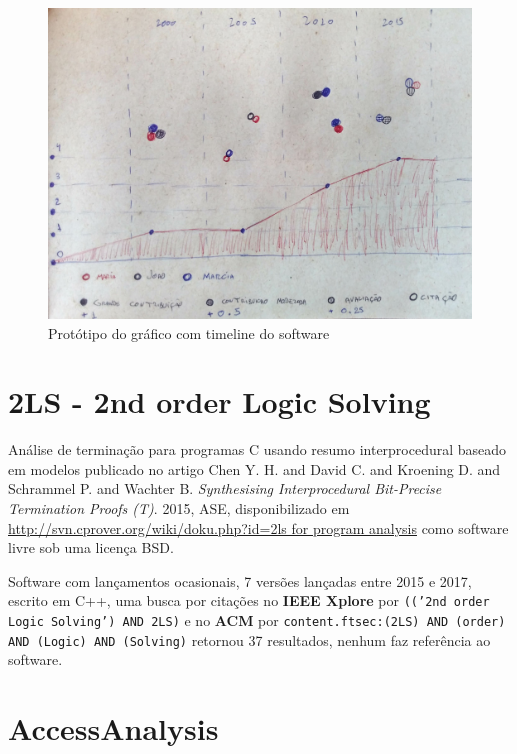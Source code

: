 

\label{softwares-summary}

\begin{figure}[h]
  \center
  \includegraphics[scale=0.35]{imagens/software-timeline-wireframe.jpg}
  \caption{Protótipo do gráfico com timeline do software}
\end{figure}

\section{2LS - 2nd order Logic Solving}

Análise de terminação para programas C usando resumo interprocedural baseado em modelos
publicado no artigo
Chen Y. H. and David C. and Kroening D. and Schrammel P. and Wachter B.
{\it Synthesising Interprocedural Bit-Precise Termination Proofs (T)}.
2015,
ASE,
disponibilizado em \url{http://svn.cprover.org/wiki/doku.php?id=2ls for program analysis}
como software livre
sob uma licença BSD.

Software com lançamentos ocasionais,
7 versões lançadas
entre 2015 e 2017,
escrito em C++,
uma busca por citações no {\bf IEEE Xplore} por
\texttt{(('2nd order Logic Solving') AND 2LS)}
e no {\bf ACM} por
\texttt{content.ftsec:(2LS) AND (order) AND (Logic) AND (Solving)}
retornou
37 resultados,
nenhum faz referência ao software.


\section{AccessAnalysis}

